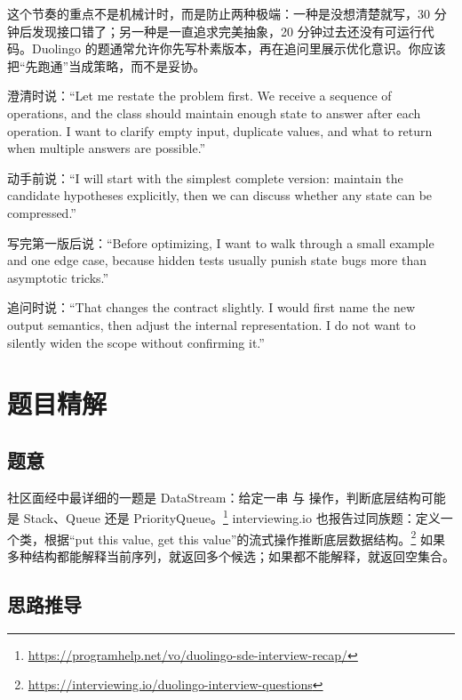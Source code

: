这个节奏的重点不是机械计时，而是防止两种极端：一种是没想清楚就写，30 分钟后发现接口错了；另一种是一直追求完美抽象，20 分钟过去还没有可运行代码。Duolingo 的题通常允许你先写朴素版本，再在追问里展示优化意识。你应该把“先跑通”当成策略，而不是妥协。

\begin{sayit}[每个阶段可以直接说出口的话]
澄清时说：“Let me restate the problem first. We receive a sequence of operations, and the class should maintain enough state to answer after each operation. I want to clarify empty input, duplicate values, and what to return when multiple answers are possible.”

动手前说：“I will start with the simplest complete version: maintain the candidate hypotheses explicitly, then we can discuss whether any state can be compressed.”

写完第一版后说：“Before optimizing, I want to walk through a small example and one edge case, because hidden tests usually punish state bugs more than asymptotic tricks.”

追问时说：“That changes the contract slightly. I would first name the new output semantics, then adjust the internal representation. I do not want to silently widen the scope without confirming it.”
\end{sayit}

\section{题目精解}


\subsection*{题意}

社区面经中最详细的一题是 DataStream：给定一串  与  操作，判断底层结构可能是 Stack、Queue 还是 PriorityQueue。\srccommunity\footnote{\url{https://programhelp.net/vo/duolingo-sde-interview-recap/}} interviewing.io 也报告过同族题：定义一个类，根据“put this value, get this value”的流式操作推断底层数据结构。\srccommunity\footnote{\url{https://interviewing.io/duolingo-interview-questions}} 如果多种结构都能解释当前序列，就返回多个候选；如果都不能解释，就返回空集合。

\subsection*{思路推导}

